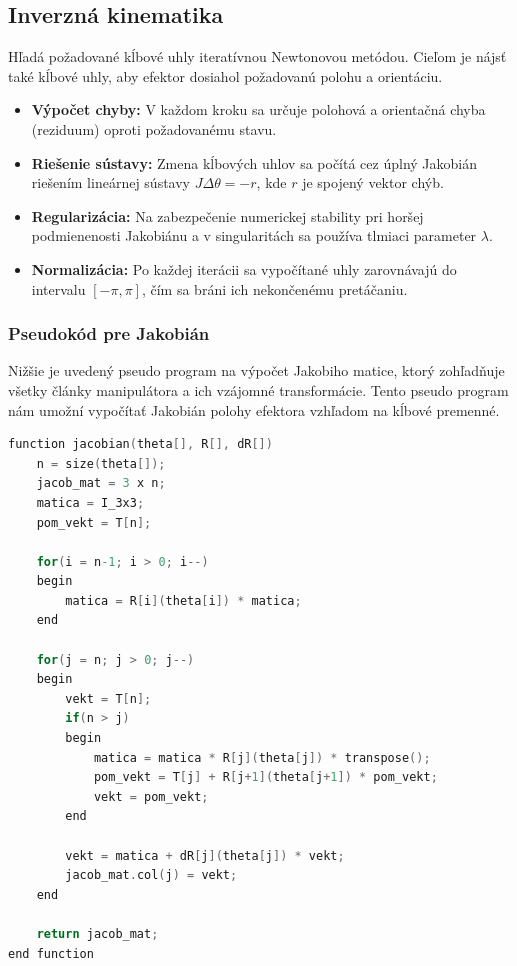 \subsection{Inverzná kinematika}

Hľadá požadované kĺbové uhly iteratívnou Newtonovou metódou. Cieľom je nájsť také kĺbové uhly, aby efektor dosiahol požadovanú polohu a orientáciu.

\begin{itemize}
	\item \textbf{Výpočet chyby:} V každom kroku sa určuje polohová a orientačná chyba (reziduum) oproti požadovanému stavu.
	\item \textbf{Riešenie sústavy:} Zmena kĺbových uhlov sa počítá cez úplný Jakobián riešením lineárnej sústavy $J\Delta\theta = -r$, kde $r$ je spojený vektor chýb.
	\item \textbf{Regularizácia:} Na zabezpečenie numerickej stability pri horšej podmienenosti Jakobiánu a v singularitách sa používa tlmiaci parameter $\lambda$.
	\item \textbf{Normalizácia:} Po každej iterácii sa vypočítané uhly zarovnávajú do intervalu $[-\pi,\pi]$, čím sa bráni ich nekončenému pretáčaniu.
\end{itemize}

\subsubsection{Pseudokód pre Jakobián}
Nižšie je uvedený pseudo program na výpočet Jakobiho matice, ktorý zohľadňuje všetky články manipulátora a ich vzájomné transformácie.
Tento pseudo program nám umožní vypočítať Jakobián polohy efektora vzhľadom na kĺbové premenné.

\begin{lstlisting}[caption={Výpočet Jakobiho matice}, language=C]
function jacobian(theta[], R[], dR[])
    n = size(theta[]);
    jacob_mat = 3 x n;
    matica = I_3x3;
    pom_vekt = T[n];
    
    for(i = n-1; i > 0; i--)
    begin
        matica = R[i](theta[i]) * matica;
    end
    
    for(j = n; j > 0; j--)
    begin
        vekt = T[n];
        if(n > j)
        begin
            matica = matica * R[j](theta[j]) * transpose();
            pom_vekt = T[j] + R[j+1](theta[j+1]) * pom_vekt;
            vekt = pom_vekt;
        end
        
        vekt = matica + dR[j](theta[j]) * vekt;
        jacob_mat.col(j) = vekt;
    end
    
    return jacob_mat;
end function
\end{lstlisting}

